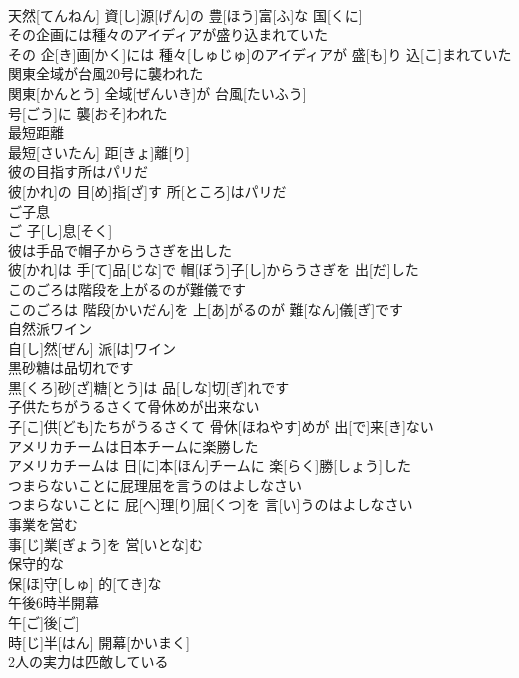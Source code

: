 \documentclass[8pt]{extreport}
\begin{document}
\begin{CJK}{UTF8}{min}
\\	天然[てんねん] 資[し]源[げん]の 豊[ほう]富[ふ]な 国[くに]
\\	その企画には種々のアイディアが盛り込まれていた	
\\	その 企[き]画[かく]には 種々[しゅじゅ]のアイディアが 盛[も]り 込[こ]まれていた
\\	関東全域が台風20号に襲われた	
\\	関東[かんとう] 全域[ぜんいき]が 台風[たいふう] 
\\	号[ごう]に 襲[おそ]われた
\\	最短距離	
\\	最短[さいたん] 距[きょ]離[り]
\\	彼の目指す所はパリだ	
\\	彼[かれ]の 目[め]指[ざ]す 所[ところ]はパリだ
\\	ご子息	
\\	ご 子[し]息[そく]
\\	彼は手品で帽子からうさぎを出した	
\\	彼[かれ]は 手[て]品[じな]で 帽[ぼう]子[し]からうさぎを 出[だ]した
\\	このごろは階段を上がるのが難儀です	
\\	このごろは 階段[かいだん]を 上[あ]がるのが 難[なん]儀[ぎ]です
\\	自然派ワイン	
\\	自[し]然[ぜん] 派[は]ワイン
\\	黒砂糖は品切れです	
\\	黒[くろ]砂[ざ]糖[とう]は 品[しな]切[ぎ]れです
\\	子供たちがうるさくて骨休めが出来ない	
\\	子[こ]供[ども]たちがうるさくて 骨休[ほねやす]めが 出[で]来[き]ない
\\	アメリカチームは日本チームに楽勝した	
\\	アメリカチームは 日[に]本[ほん]チームに 楽[らく]勝[しょう]した
\\	つまらないことに屁理屈を言うのはよしなさい	
\\	つまらないことに 屁[へ]理[り]屈[くつ]を 言[い]うのはよしなさい
\\	事業を営む	
\\	事[じ]業[ぎょう]を 営[いとな]む
\\	保守的な	
\\	保[ほ]守[しゅ] 的[てき]な
\\	午後6時半開幕	
\\	午[ご]後[ご] 
\\	時[じ]半[はん] 開幕[かいまく]
\\	2人の実力は匹敵している	

\end{CJK}
\end{document}
